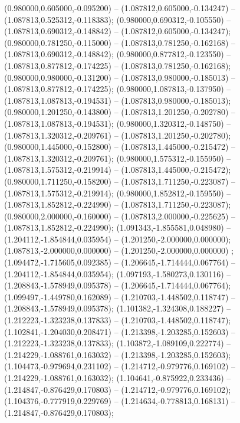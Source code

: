  (0.980000,0.605000,-0.095200) -- (1.087812,0.605000,-0.134247) -- (1.087813,0.525312,-0.118383);
 (0.980000,0.690312,-0.105550) -- (1.087813,0.690312,-0.148842) -- (1.087812,0.605000,-0.134247);
 (0.980000,0.781250,-0.115000) -- (1.087813,0.781250,-0.162168) -- (1.087813,0.690312,-0.148842);
 (0.980000,0.877812,-0.123550) -- (1.087813,0.877812,-0.174225) -- (1.087813,0.781250,-0.162168);
 (0.980000,0.980000,-0.131200) -- (1.087813,0.980000,-0.185013) -- (1.087813,0.877812,-0.174225);
 (0.980000,1.087813,-0.137950) -- (1.087813,1.087813,-0.194531) -- (1.087813,0.980000,-0.185013);
 (0.980000,1.201250,-0.143800) -- (1.087813,1.201250,-0.202780) -- (1.087813,1.087813,-0.194531);
 (0.980000,1.320312,-0.148750) -- (1.087813,1.320312,-0.209761) -- (1.087813,1.201250,-0.202780);
 (0.980000,1.445000,-0.152800) -- (1.087813,1.445000,-0.215472) -- (1.087813,1.320312,-0.209761);
 (0.980000,1.575312,-0.155950) -- (1.087813,1.575312,-0.219914) -- (1.087813,1.445000,-0.215472);
 (0.980000,1.711250,-0.158200) -- (1.087813,1.711250,-0.223087) -- (1.087813,1.575312,-0.219914);
 (0.980000,1.852812,-0.159550) -- (1.087813,1.852812,-0.224990) -- (1.087813,1.711250,-0.223087);
 (0.980000,2.000000,-0.160000) -- (1.087813,2.000000,-0.225625) -- (1.087813,1.852812,-0.224990);
 (1.091343,-1.855581,0.048980) -- (1.204112,-1.854844,0.035954) -- (1.201250,-2.000000,0.000000);
 (1.087813,-2.000000,0.000000) -- (1.201250,-2.000000,0.000000) ;
 (1.094472,-1.715605,0.092385) -- (1.206645,-1.714444,0.067764) -- (1.204112,-1.854844,0.035954);
 (1.097193,-1.580273,0.130116) -- (1.208843,-1.578949,0.095378) -- (1.206645,-1.714444,0.067764);
 (1.099497,-1.449780,0.162089) -- (1.210703,-1.448502,0.118747) -- (1.208843,-1.578949,0.095378);
 (1.101382,-1.324308,0.188227) -- (1.212223,-1.323238,0.137833) -- (1.210703,-1.448502,0.118747);
 (1.102841,-1.204030,0.208471) -- (1.213398,-1.203285,0.152603) -- (1.212223,-1.323238,0.137833);
 (1.103872,-1.089109,0.222774) -- (1.214229,-1.088761,0.163032) -- (1.213398,-1.203285,0.152603);
 (1.104473,-0.979694,0.231102) -- (1.214712,-0.979776,0.169102) -- (1.214229,-1.088761,0.163032);
 (1.104641,-0.875922,0.233436) -- (1.214847,-0.876429,0.170803) -- (1.214712,-0.979776,0.169102);
 (1.104376,-0.777919,0.229769) -- (1.214634,-0.778813,0.168131) -- (1.214847,-0.876429,0.170803);
